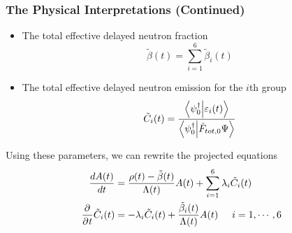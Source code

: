 \documentclass[10pt,compress]{beamer}
\begin{document}
\begin{frame}\frametitle{The Physical Interpretations (Continued)}
    \begin{itemize}
        \item \begin{flushleft}
            The total effective delayed neutron fraction
            \begin{equation}
                \tilde{\beta}(t) = \sum_{i=1}^6 \tilde{\beta}_i(t)\nonumber
            \end{equation}
        \end{flushleft}
        \item \begin{flushleft}
            The total effective delayed neutron emission for the $i$th group
            \begin{equation}
                \tilde{C}_i(t)=\frac{\braket{\psi_0^\dagger}{\varepsilon_i(t)}}{\braket{\psi_0^\dagger}{\hat{F}_{tot,0}\Psi}}\nonumber
            \end{equation}
        \end{flushleft}
    \end{itemize}
    Using these parameters, we can rewrite the projected equations
    \begin{equation}
        \begin{split}
            \frac{dA(t)}{dt} &= \frac{\rho(t)- \tilde{\beta}(t)}{\Lambda(t)}A(t) + \sum_{i=1}^6\lambda_i \tilde{C}_i(t)\nonumber\\
            \frac{\partial^{} }{\partial^{} t}\tilde{C}_i(t) &= -\lambda_i \tilde{C}_i(t) + \frac{\tilde{\beta}_i(t)}{\Lambda(t)}A(t)\hspace{5mm} i=1,\cdots, 6
        \end{split}
    \end{equation}
\end{frame}
\end{document}
